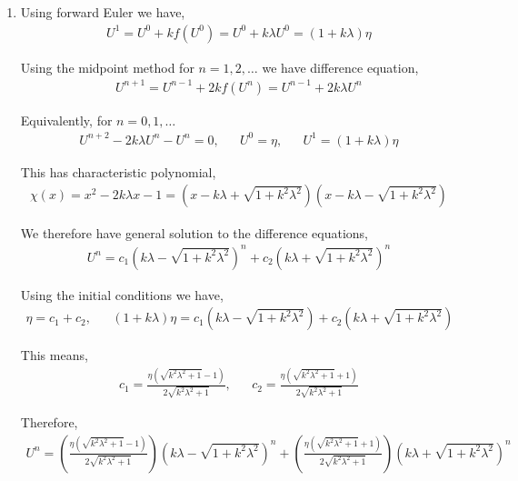 \documentclass[10pt]{article}
\begin{document}
\begin{solution}[Solution]

\begin{enumerate}[label=(\alph*)]
    \item Using forward Euler we have,
    \begin{align*}
        U^1 = U^0 + k f(U^0) = U^0 + k\lambda U^0 = (1+k\lambda)\eta
    \end{align*}

    Using the midpoint method for \( n=1,2,\ldots \) we have difference equation,
    \begin{align*}
        U^{n+1} = U^{n-1} + 2kf(U^n) = U^{n-1} + 2k\lambda U^n
    \end{align*}

    Equivalently, for \( n=0,1,\ldots \)
    \begin{align*}
        U^{n+2} -2k\lambda U^{n} - U^{n} = 0, && U^0 = \eta, && U^1 = (1+k\lambda)\eta
    \end{align*}

    This has characteristic polynomial,
    \begin{align*}
        \chi(x) = x^2 - 2k\lambda x-1 = \left(x-k\lambda+\sqrt{1+k^2\lambda^2}\right)\left(x-k\lambda-\sqrt{1+k^2\lambda^2}\right)
    \end{align*}

    We therefore have general solution to the difference equations,
    \begin{align*}
        U^{n} = c_1 \left(k\lambda-\sqrt{1+k^2\lambda^2}\right)^n + c_2 \left(k\lambda+\sqrt{1+k^2\lambda^2}\right)^n
    \end{align*}

    Using the initial conditions we have,
    \begin{align*}
        \eta = c_1 + c_2, && (1+k\lambda)\eta = c_1 \left(k\lambda-\sqrt{1+k^2\lambda^2}\right) + c_2 \left(k\lambda+\sqrt{1+k^2\lambda^2}\right)
    \end{align*}

    This means,
    \begin{align*}
        c_1 = \frac{\eta  \left(\sqrt{k^2\lambda^2+1}-1\right)}{2 \sqrt{k^2\lambda^2+1}}, &&
        c_2 = \frac{\eta  \left(\sqrt{k^2\lambda^2+1}+1\right)}{2 \sqrt{k^2\lambda^2+1}}
    \end{align*}

    Therefore,
    \begin{align*}
        U^n = \left( \frac{\eta  \left(\sqrt{k^2\lambda^2+1}-1\right)}{2 \sqrt{k^2\lambda^2+1}} \right) \left(k\lambda-\sqrt{1+k^2\lambda^2}\right)^n + \left( \frac{\eta  \left(\sqrt{k^2\lambda^2+1}+1\right)}{2 \sqrt{k^2\lambda^2+1}}\right)  \left(  k\lambda+\sqrt{1+k^2\lambda^2}\right)^n
    \end{align*}


\end{enumerate}
\end{solution}
\end{document}
